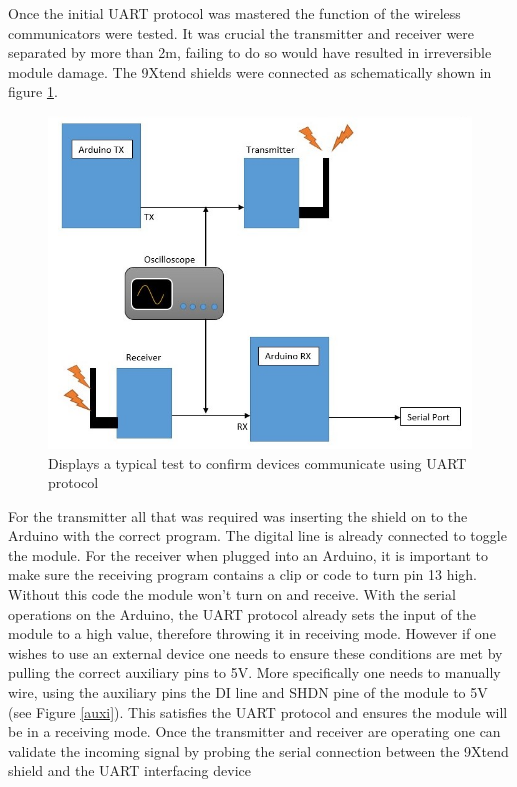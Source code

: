 \documentclass[paper=a4, fontsize=11pt]{scrartcl}
\numberwithin{equation}{section}		%
\numberwithin{figure}{section}			%
\numberwithin{table}{section}				%
\begin{document}
Once the initial UART protocol was mastered the function of the wireless communicators were tested. It was crucial the transmitter and receiver were separated by more than 2m, failing to do so would have resulted in irreversible module damage. The 9Xtend shields were connected as schematically shown in figure \ref{test2}. 

\begin{figure}[H]
\centering
\includegraphics[width=0.9\linewidth]{test2}
\caption{ Displays a typical test to confirm devices communicate using UART protocol}
\label{test2}
\end{figure}

For the transmitter all that was required was inserting the shield on to the Arduino with the correct program. The digital line is already connected to toggle the module. For the receiver when plugged into an Arduino, it is important to make sure the receiving program contains a clip or code to turn pin 13 high. Without this code the module won't turn on and receive. With the serial operations on the Arduino, the UART protocol already sets the input of the module to a high value, therefore throwing it in receiving mode. However if one wishes to use an external device one needs to ensure these conditions are met by pulling the correct auxiliary pins to 5V. More specifically one needs to manually wire, using the auxiliary pins the DI line and SHDN pine of the module to 5V (see Figure \ref{auxi}). This satisfies the UART protocol and ensures the module will be in a receiving mode. Once the transmitter and receiver are operating one can validate the incoming signal by probing the serial connection between the 9Xtend shield and the UART interfacing device
\end{document}
